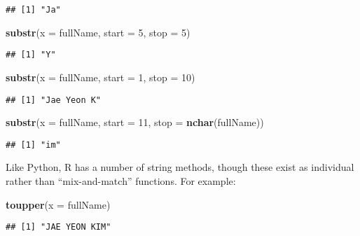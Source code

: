 \documentclass[
]{book}
\newenvironment{Shaded}{\begin{snugshade}}{\end{snugshade}}
\newcommand{\DataTypeTok}[1]{\textcolor[rgb]{0.13,0.29,0.53}{#1}}
\newcommand{\DecValTok}[1]{\textcolor[rgb]{0.00,0.00,0.81}{#1}}
\newcommand{\KeywordTok}[1]{\textcolor[rgb]{0.13,0.29,0.53}{\textbf{#1}}}
\newcommand{\NormalTok}[1]{#1}
\begin{document}
\begin{verbatim}
## [1] "Ja"
\end{verbatim}

\begin{Shaded}
\begin{Highlighting}[]
\KeywordTok{substr}\NormalTok{(}\DataTypeTok{x =}\NormalTok{ fullName, }\DataTypeTok{start =} \DecValTok{5}\NormalTok{, }\DataTypeTok{stop =} \DecValTok{5}\NormalTok{)}
\end{Highlighting}
\end{Shaded}

\begin{verbatim}
## [1] "Y"
\end{verbatim}

\begin{Shaded}
\begin{Highlighting}[]
\KeywordTok{substr}\NormalTok{(}\DataTypeTok{x =}\NormalTok{ fullName, }\DataTypeTok{start =} \DecValTok{1}\NormalTok{, }\DataTypeTok{stop =} \DecValTok{10}\NormalTok{)}
\end{Highlighting}
\end{Shaded}

\begin{verbatim}
## [1] "Jae Yeon K"
\end{verbatim}

\begin{Shaded}
\begin{Highlighting}[]
\KeywordTok{substr}\NormalTok{(}\DataTypeTok{x =}\NormalTok{ fullName, }\DataTypeTok{start =} \DecValTok{11}\NormalTok{, }\DataTypeTok{stop =} \KeywordTok{nchar}\NormalTok{(fullName))}
\end{Highlighting}
\end{Shaded}

\begin{verbatim}
## [1] "im"
\end{verbatim}

Like Python, R has a number of string methods, though these exist as individual rather than ``mix-and-match'' functions. For example:

\begin{Shaded}
\begin{Highlighting}[]
\KeywordTok{toupper}\NormalTok{(}\DataTypeTok{x =}\NormalTok{ fullName)}
\end{Highlighting}
\end{Shaded}

\begin{verbatim}
## [1] "JAE YEON KIM"
\end{verbatim}
\end{document}
